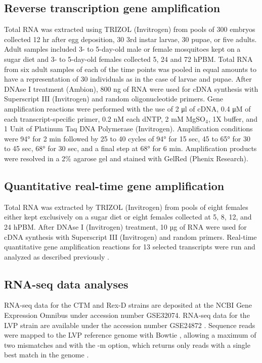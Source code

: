 \subsection{Reverse transcription gene amplification}
Total RNA was extracted using TRIZOL (Invitrogen) from pools of 300 embryos collected 12 hr after egg deposition, 30 3rd instar larvae, 30 pupae, or five adults. Adult samples included 3- to 5-day-old male or female mosquitoes kept on a sugar diet and 3- to 5-day-old females collected 5, 24 and 72 hPBM. Total RNA from six adult samples of each of the time points was pooled in equal amounts to have a representation of 30 individuals as in the case of larvae and pupae. After DNAse I treatment (Ambion), 800 ng of RNA were used for cDNA synthesis with Superscript III (Invitrogen) and random oligonucleotide primers. Gene amplification reactions were performed with the use of 2 μl of cDNA, 0.4 μM of each transcript-specific primer, 0.2 nM each dNTP, 2 mM MgSO$_{4}$, 1X buffer, and 1 Unit of Platinum Taq DNA Polymerase (Invitrogen). Amplification conditions were 94° for 2 min followed by 25 to 40 cycles of 94° for 15 sec, 45 to 65° for 30 to 45 sec, 68° for 30 sec, and a final step at 68° for 6 min. Amplification products were resolved in a 2\% agarose gel and stained with GelRed (Phenix Research).

\subsection{Quantitative real-time gene amplification}
Total RNA was extracted by TRIZOL (Invitrogen) from pools of eight females either kept exclusively on a sugar diet or eight females collected at 5, 8, 12, and 24 hPBM. After DNAse I (Invitrogen) treatment, 10 µg of RNA were used for cDNA synthesis with Superscript III (Invitrogen) and random primers. Real-time quantitative gene amplification reactions for 13 selected transcripts were run and analyzed as described previously \cite{Bonizzoni2011}.

\subsection{RNA-seq data analyses}
RNA-seq data for the CTM and Rex-D strains are deposited at the NCBI Gene Expression Omnibus under accession number GSE32074. RNA-seq data for the LVP strain are available under the accession number GSE24872 \cite{Bonizzoni2011}. Sequence reads were mapped to the LVP reference genome with Bowtie \cite{Langmead2009}, allowing a maximum of two mismatches and with the -m option, which returns only reads with a single best match in the genome \cite{Bonizzoni2011}.

